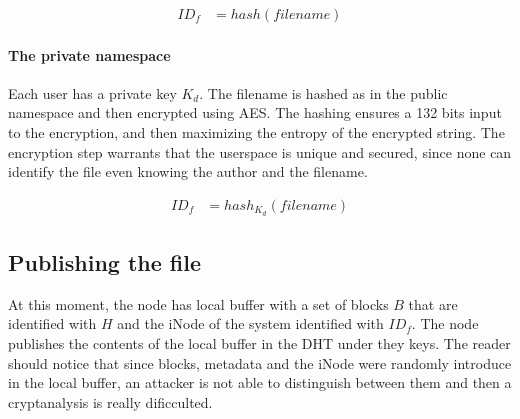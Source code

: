 \documentclass{llncs}
\begin{document}
\begin{align}
ID_f & = hash(filename)
 \end{align}

\paragraph{The private namespace}
Each user has a private key $K_d$. The
filename is hashed as in the public namespace and then encrypted using AES. The
hashing ensures a 132 bits input to the encryption, and then maximizing the entropy of the
encrypted string. The encryption step warrants that the userspace is unique and secured, since none can identify
the file even knowing the author and the filename.

\begin{align}
ID_f & = hash_{K_d}(filename)
 \end{align}

% 

\subsection{Publishing the file}

At this moment, the node has local buffer with a set of blocks $B$ that are identified with $H$ and the iNode of the system identified with $ID_f$. The node publishes the contents of the local buffer in the DHT under they keys. The reader should notice that since blocks, metadata and the iNode were randomly introduce in the local buffer, an attacker is not able to distinguish between them and then a cryptanalysis is really dificculted.
\end{document}
